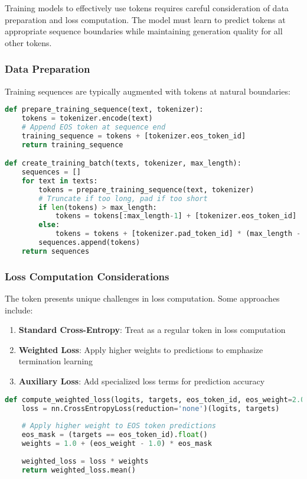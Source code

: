 Training models to effectively use \eos{} tokens requires careful consideration of data preparation and loss computation. The model must learn to predict \eos{} tokens at appropriate sequence boundaries while maintaining generation quality for all other tokens.

\subsubsection{Data Preparation}

Training sequences are typically augmented with \eos{} tokens at natural boundaries:

\begin{lstlisting}[language=Python, caption=Training data preparation with \eos{} tokens]
def prepare_training_sequence(text, tokenizer):
    tokens = tokenizer.encode(text)
    # Append EOS token at sequence end
    training_sequence = tokens + [tokenizer.eos_token_id]
    return training_sequence

def create_training_batch(texts, tokenizer, max_length):
    sequences = []
    for text in texts:
        tokens = prepare_training_sequence(text, tokenizer)
        # Truncate if too long, pad if too short
        if len(tokens) > max_length:
            tokens = tokens[:max_length-1] + [tokenizer.eos_token_id]
        else:
            tokens = tokens + [tokenizer.pad_token_id] * (max_length - len(tokens))
        sequences.append(tokens)
    return sequences
\end{lstlisting}

\subsubsection{Loss Computation Considerations}

The \eos{} token presents unique challenges in loss computation. Some approaches include:

\begin{enumerate}
\item \textbf{Standard Cross-Entropy}: Treat \eos{} as a regular token in loss computation
\item \textbf{Weighted Loss}: Apply higher weights to \eos{} predictions to emphasize termination learning
\item \textbf{Auxiliary Loss}: Add specialized loss terms for \eos{} prediction accuracy
\end{enumerate}

\begin{lstlisting}[language=Python, caption=Weighted loss for \eos{} token training]
def compute_weighted_loss(logits, targets, eos_token_id, eos_weight=2.0):
    loss = nn.CrossEntropyLoss(reduction='none')(logits, targets)
    
    # Apply higher weight to EOS token predictions
    eos_mask = (targets == eos_token_id).float()
    weights = 1.0 + (eos_weight - 1.0) * eos_mask
    
    weighted_loss = loss * weights
    return weighted_loss.mean()
\end{lstlisting}

